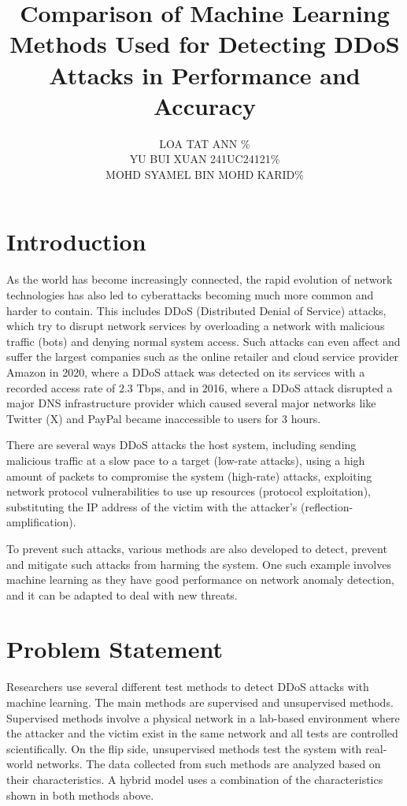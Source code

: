 \documentclass[a4paper, 12pt]{article}
\author{
LOA TAT ANN \quad 1221304731 \quad 33.33\%\\
YU BUI XUAN \quad 241UC24121\quad 33.33\%\\
MOHD SYAMEL BIN MOHD KARID\quad 1221309130\quad 33.33\%\\
}
\title{Comparison of Machine Learning Methods Used for Detecting DDoS Attacks in Performance and Accuracy}
\begin{document}
\maketitle

\section{Introduction}
As the world has become increasingly connected, the rapid evolution of network technologies has also led to cyberattacks becoming much more common and harder to contain. This includes DDoS (Distributed Denial of Service) attacks, which try to disrupt network services by overloading a network with malicious traffic (bots) and denying normal system access.  Such attacks can even affect and suffer the largest companies such as the online retailer and cloud service provider Amazon in 2020, where a DDoS attack was detected on its services with a recorded access rate of 2.3 Tbps, and in 2016, where a DDoS attack disrupted a major DNS infrastructure provider which caused several major networks like Twitter (X) and PayPal became inaccessible to users for 3 hours.  

There are several ways DDoS attacks the host system, including sending malicious traffic at a slow pace to a target (low-rate attacks), using a high amount of packets to compromise the system (high-rate) attacks, exploiting network protocol vulnerabilities to use up resources (protocol exploitation), substituting the IP address of the victim with the attacker's (reflection-amplification). 

To prevent such attacks, various methods are also developed to detect, prevent and mitigate such attacks from harming the system. One such example involves machine learning as they have good performance on network anomaly detection, and it can be adapted to deal with new threats. 

\section{Problem Statement}
Researchers use several different test methods to detect DDoS attacks with machine learning. The main methods are supervised and unsupervised methods. Supervised methods involve a physical network in a lab-based environment where the attacker and the victim exist in the same network and all tests are controlled scientifically. On the flip side, unsupervised methods test the system with real-world networks. The data collected from such methods are analyzed based on their characteristics. A hybrid model uses a combination of the characteristics shown in both methods above. 
\end{document}

